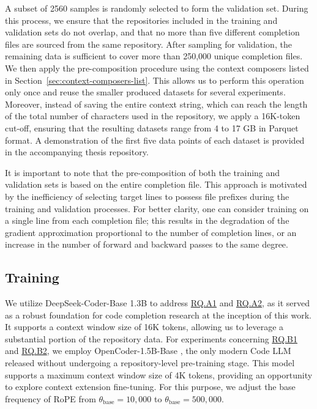 A subset of 2560 samples is randomly selected to form the validation set. During this process, we ensure that the repositories included in the training and validation sets do not overlap, and that no more than five different completion files are sourced from the same repository. After sampling for validation, the remaining data is sufficient to cover more than 250,000 unique completion files. We then apply the pre-composition procedure using the context composers listed in Section~\ref{sec:context-composers-list}. This allows us to perform this operation only once and reuse the smaller produced datasets for several experiments. Moreover, instead of saving the entire context string, which can reach the length of the total number of characters used in the repository, we apply a 16K-token cut-off, ensuring that the resulting datasets range from 4 to 17 GB in Parquet format. A demonstration of the first five data points of each dataset is provided in the accompanying thesis repository.

It is important to note that the pre-composition of both the training and validation sets is based on the entire completion file. This approach is motivated by the inefficiency of selecting target lines to possess file prefixes during the training and validation processes. For better clarity, one can consider training on a single line from each completion file; this results in the degradation of the gradient approximation proportional to the number of completion lines, or an increase in the number of forward and backward passes to the same degree.

\subsection{Training}

We utilize DeepSeek-Coder-Base 1.3B \parencite{guo2024} to address \hyperref[rq:rq-a1]{RQ.A1} and \hyperref[rq:rq-a2]{RQ.A2}, as it served as a robust foundation for code completion research at the inception of this work. It supports a context window size of 16K tokens, allowing us to leverage a substantial portion of the repository data. For experiments concerning \hyperref[rq:rq-b1]{RQ.B1} and \hyperref[rq:rq-b2]{RQ.B2}, we employ OpenCoder-1.5B-Base \parencite{huang2024}, the only modern Code LLM released without undergoing a repository-level pre-training stage. This model supports a maximum context window size of 4K tokens, providing an opportunity to explore context extension fine-tuning. For this purpose, we adjust the base frequency of RoPE from \(\theta_{\mathrm{base}} = 10{,}000\) to \(\theta_{\mathrm{base}} = 500{,}000\).

